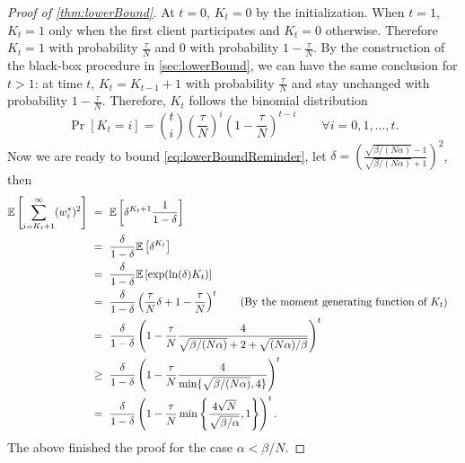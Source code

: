 \begin{proof}[Proof of \autoref{thm:lowerBound}]
    At $t=0$, $K_t = 0$ by the initialization. When $t=1$, $K_t=1$ only when the first client participates and $K_t = 0$ otherwise. Therefore $K_t = 1$ with probability $\frac{\tau}{N}$ and $0$ with probability $1 - \frac{\tau}{N}$. By the construction of the black-box procedure in \autoref{sec:lowerBound}, we can have the same conclusion for $t > 1$: at time $t$, $K_t = K_{t-1}+1$ with probability $\frac{\tau}{N}$ and stay unchanged with probability $1- \frac{\tau}{N}$. Therefore, $K_t$ follows the binomial distribution
    \[
        \Pr[ K_t = i ] = \binom{t}{i} \left( \frac{\tau}{N} \right)^i  \left( 1 - \frac{\tau}{N} \right)^{t-i} \qquad \forall i = 0, 1, \ldots, t.
    \]
    Now we are ready to bound \eqref{eq:lowerBoundReminder}, let $\delta = \left( \frac{\sqrt{ \beta/(N \alpha) } - 1}{ \sqrt{ \beta/(N \alpha) } + 1 } \right)^2 $, then
    \begin{align*}
        \mathbb{E} \left[ \sum_{i= K_t+1}^{\infty} ( w^*_i )^2 \right] &~=~ \mathbb{E} \left[ \delta^{K_t + 1} \frac{1}{1 - \delta} \right]  \\
        &~=~ \frac{\delta}{1-\delta} \mathbb{E} \left[ \delta^{K_t} \right]  \\
        &~=~ \frac{\delta}{1-\delta} \mathbb{E} \left[ \exp ( \ln(\delta) K_t ) \right]  \\
        &~=~ \frac{\delta}{1-\delta} \left( \frac{\tau}{N} \delta + 1 -  \frac{\tau}{N} \right)^t \quad  \hbox{\quad(By the moment generating function of $K_t$)\quad} \\
        &~=~ \frac{\delta}{1-\delta} \left( 1 -  \frac{\tau}{N} \frac{4}{ \sqrt{ \beta/(N \alpha) } + 2 + \sqrt{ (N \alpha)/\beta }  } \right)^t \\
        &~\geq~ \frac{\delta}{1-\delta} \left( 1 -  \frac{\tau}{N} \frac{4}{ \min\{ \sqrt{ \beta/(N \alpha) } , 4\} } \right)^t \\
        &~=~ \frac{\delta}{1-\delta} \left( 1 -  \frac{\tau}{N} \min\left\{ \frac{4 \sqrt{N} }{ \sqrt{ \beta/\alpha }  }, 1 \right\} \right)^t.
    \end{align*}
    The above finished the proof for the case $\alpha < \beta/N$.
    

\end{proof}
